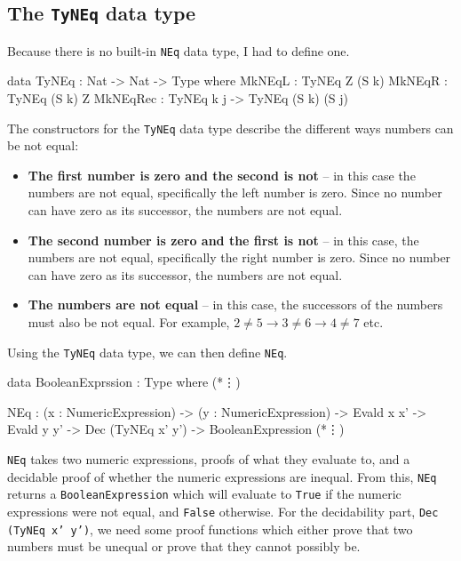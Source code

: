     \subsection{The \texttt{TyNEq} data type}
        Because there is no built-in \texttt{NEq} data type, I had to define one.
        \begin{code}[label={des:neq:ty-neq}, caption={The data type used for capturing inequality}]
        data TyNEq : Nat -> Nat -> Type where
            MkNEqL   : TyNEq Z (S k)
            MkNEqR   : TyNEq (S k) Z
            MkNEqRec : TyNEq k j -> TyNEq (S k) (S j)
        \end{code}
        The constructors for the \texttt{TyNEq} data type describe the different ways numbers can be not equal:
        \begin{itemize}
            \item \textbf{The first number is zero and the second is not} -- in this case the numbers are not equal, specifically the left number is zero. Since no number can have zero as its successor, the numbers are not equal.
            \item \textbf{The second number is zero and the first is not} -- in this case, the numbers are not equal, specifically the right number is zero. Since no number can have zero as its successor, the numbers are not equal.
            \item \textbf{The numbers are not equal} -- in this case, the successors of the numbers must also be not equal. For example, $2 \neq 5 \rightarrow 3 \neq 6 \rightarrow 4 \neq 7$ etc.
        \end{itemize}
        Using the \texttt{TyNEq} data type, we can then define \texttt{NEq}.
        \begin{code}[label={des:neq-code}, caption={The definition of \texttt{NEq}}, escapeinside={(*}{*)}]
        data BooleanExprssion : Type where
            (*\vdots*)
            
            NEq :  (x : NumericExpression)
                -> (y : NumericExpression)
                -> Evald x x'
                -> Evald y y'
                -> Dec (TyNEq x' y')
                -> BooleanExpression
            (*\vdots*)
        \end{code}
    
        \texttt{NEq} takes two numeric expressions, proofs of what they evaluate to, and a decidable proof of whether the numeric expressions are inequal. From this, \texttt{NEq} returns a \texttt{BooleanExpression} which will evaluate to \texttt{True} if the numeric expressions were not equal, and \texttt{False} otherwise. For the decidability part,\linebreak
        \texttt{Dec (TyNEq x' y')}, we need some proof functions which either prove that two numbers must be unequal or prove that they cannot possibly be.
    

